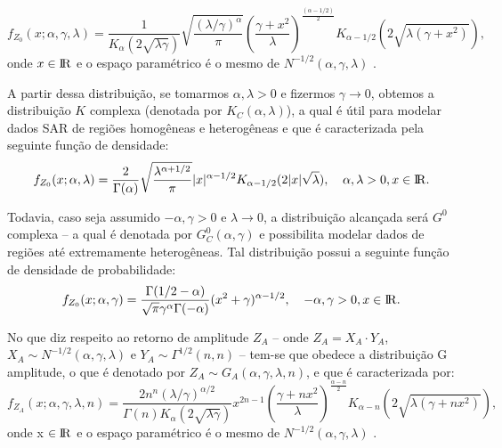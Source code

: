 \documentclass[12pt]{article}
\begin{document}
\begin{displaymath}
    f_{Z_0}(x; \alpha, \gamma, \lambda) = \frac{1}{K_{\alpha}(2\sqrt{\lambda \gamma})} \sqrt{\frac{(\lambda / \gamma)^{\alpha}}{\pi}} \left( \frac{\gamma + x^2}{\lambda}\right)^\frac{(\alpha - 1/2)}{2} K_{\alpha - 1/2}(2\sqrt{\lambda(\gamma + x^2)}), 
\end{displaymath}
onde $x \in {\rm I\!R}$ e o espaço paramétrico é o mesmo de $N^{-1/2}(\alpha, \gamma, \lambda)$ \cite{frery97}.

A partir dessa distribuição, se tomarmos $\alpha, \lambda > 0$ e fizermos $\gamma \rightarrow 0$, obtemos a distribuição $K$ complexa (denotada por $K_C(\alpha, \lambda)$), a qual é útil para modelar dados SAR de regiões homogêneas e heterogêneas e que é caracterizada pela seguinte função de densidade:
\begin{displaymath}
    f_{Z_0}(x; \alpha, \lambda) = \frac{2}{\Gamma(\alpha)} \sqrt{\frac{\lambda^{\alpha + 1/2}}{\pi}} |x|^{\alpha - 1/2} K_{\alpha - 1/2}(2|x|\sqrt{\lambda}), \hspace{0.03\linewidth}\alpha, \lambda > 0, x \in {\rm I\!R}.
\end{displaymath}

Todavia, caso seja assumido $-\alpha, \gamma > 0$ e $\lambda \rightarrow 0$, a distribuição alcançada será $G^0$ complexa -- a qual é denotada por $G_C^0(\alpha, \gamma)$ e possibilita modelar dados de regiões até extremamente heterogêneas. Tal distribuição possui a seguinte função de densidade de probabilidade:
\begin{displaymath}
    f_{Z_0}(x; \alpha, \gamma) = \frac{\Gamma(1/2 - \alpha)}{\sqrt{\pi} \gamma^{\alpha} \Gamma(-\alpha)} (x^2 + \gamma)^{\alpha - 1/2}, \hspace{0.03\linewidth} -\alpha, \gamma > 0, x \in {\rm I\!R}.
\end{displaymath}

No que diz respeito ao retorno de amplitude $Z_A$ -- onde $Z_A = X_A \cdot Y_A$, $X_A \sim N^{-1/2}(\alpha, \gamma, \lambda)$ e $Y_A \sim \Gamma^{1/2}(n, n)$ -- tem-se que obedece a distribuição G amplitude, o que é denotado por $Z_A \sim G_A(\alpha, \gamma, \lambda, n)$, e que é caracterizada por:
\begin{displaymath}
    f_{Z_A}(x; \alpha, \gamma, \lambda, n) = \frac{2n^n (\lambda/\gamma)^{\alpha/2}}{\Gamma(n) K_{\alpha}(2\sqrt{\lambda \gamma})} x^{2n-1} \left( \frac{\gamma + nx^2}{\lambda} \right)^{\frac{\alpha - n}{2}} K_{\alpha - n}(2\sqrt{\lambda (\gamma + nx^2)}),
\end{displaymath}
onde x $\in {\rm I\!R}$ e o espaço paramétrico é o mesmo de $N^{-1/2}(\alpha, \gamma, \lambda)$ \cite{frery97}.
\end{document}
